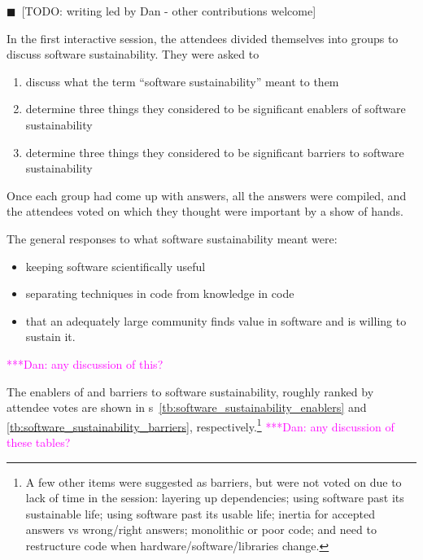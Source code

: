 \documentclass[11pt, oneside]{amsart}
\newcommand{\todo}[1]{{\color{blue}$\blacksquare$~\textsf{[TODO: #1]}}}
\newcommand{\katznote}[1]{ {\textcolor{magenta}    { ***Dan:      #1 }}}
\begin{document}
\todo{writing led by Dan - other contributions welcome}

In the first interactive session, the attendees divided themselves into groups
to discuss software sustainability. They were asked to
\begin{enumerate}
\item discuss what the term ``software sustainability'' meant to them

\item determine three things they considered to be significant enablers of
software sustainability

\item determine three things they considered to be significant barriers to
software sustainability
\end{enumerate}
Once each group had come up with answers, all the answers were compiled, and the
attendees voted on which they thought were important by a show of hands.

The general responses to what software sustainability meant were:
\begin{itemize}
\item keeping software scientifically useful
\item separating techniques in code from knowledge in code
\item that an adequately large community finds value in software and is willing
to sustain it.
\end{itemize}
\katznote{any discussion of this?}

The enablers of and barriers to software sustainability, roughly ranked by
attendee votes are shown in
{\tablename}s~\ref{tb:software_sustainability_enablers} and
\ref{tb:software_sustainability_barriers}, respectively.\footnote{A few other
items were suggested as barriers, but were not voted on due to lack of time in
the session:
layering up dependencies;
using software past its sustainable life;
using software past its usable life;
inertia for accepted answers vs wrong/right answers;
monolithic or poor code; and
need to restructure code when hardware/software/libraries change.
}
\katznote{any discussion of these tables?}
\end{document}
